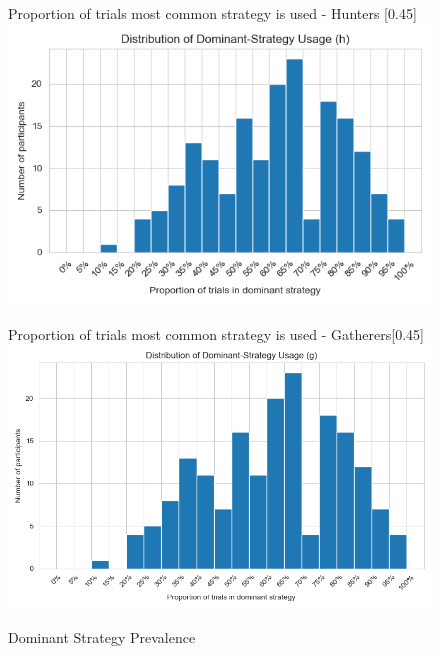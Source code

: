 \documentclass[manuscript,review,anonymous]{acmart}
\begin{document}
     \begin{figure}[htbp]
          \centering
          \begin{subcaptionbox}{Proportion of trials most common strategy is used - Hunters \label{fig:h1}}[0.45\textwidth]
            {\centering\includegraphics[width=\linewidth]{plots/strategies/dominant_prop_first_visits_area_screen_loc_h.png}}
          \end{subcaptionbox}
          \hfill
          \begin{subcaptionbox}{Proportion of trials most common strategy is used - Gatherers\label{fig:h2}}[0.45\textwidth]
            {\centering\includegraphics[width=\linewidth]{plots/strategies/dominant_prop_first_visits_area_screen_loc_g.png}}
          \end{subcaptionbox}
     \caption{Dominant Strategy Prevalence}
     \label{fig:dom_props}
    \end{figure}
\end{document}
